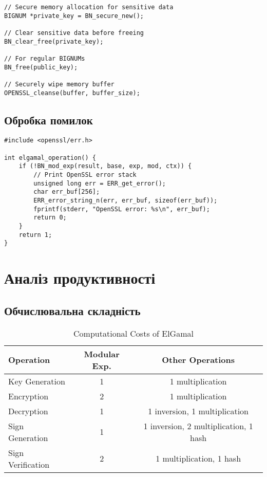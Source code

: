 \begin{verbatim}
// Secure memory allocation for sensitive data
BIGNUM *private_key = BN_secure_new();

// Clear sensitive data before freeing
BN_clear_free(private_key);

// For regular BIGNUMs
BN_free(public_key);

// Securely wipe memory buffer
OPENSSL_cleanse(buffer, buffer_size);
\end{verbatim}

\subsection{Обробка помилок}

\begin{verbatim}
#include <openssl/err.h>

int elgamal_operation() {
    if (!BN_mod_exp(result, base, exp, mod, ctx)) {
        // Print OpenSSL error stack
        unsigned long err = ERR_get_error();
        char err_buf[256];
        ERR_error_string_n(err, err_buf, sizeof(err_buf));
        fprintf(stderr, "OpenSSL error: %s\n", err_buf);
        return 0;
    }
    return 1;
}
\end{verbatim}

\section{Аналіз продуктивності}

\subsection{Обчислювальна складність}

\begin{table}[ht]
    \centering
    \begin{tabular}{|l|c|c|}
        \hline
        \textbf{Operation} & \textbf{Modular Exp.} & \textbf{Other Operations}             \\
        \hline
        Key Generation     & 1                     & 1 multiplication                      \\
        Encryption         & 2                     & 1 multiplication                      \\
        Decryption         & 1                     & 1 inversion, 1 multiplication         \\
        \hline
        Sign Generation    & 1                     & 1 inversion, 2 multiplication, 1 hash \\
        Sign Verification  & 2                     & 1 multiplication, 1 hash              \\
        \hline
    \end{tabular}
    \caption{Computational Costs of ElGamal}
\end{table}

